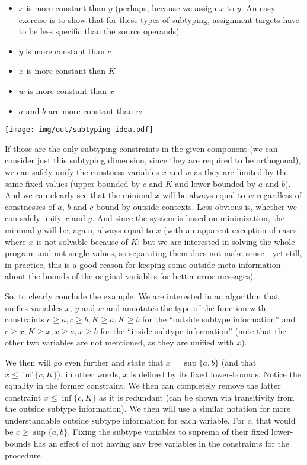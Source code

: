 \begin{itemize}
    \item $x$ is more constant than $y$ (perhaps, because we assign $x$ to $y$. An easy exercise is to show that for these types of subtyping, assignment targets have to be less specific than the source operands)
    \item $y$ is more constant than $c$
    \item $x$ is more constant than $K$
    \item $w$ is more constant than $x$
    \item $a$ and $b$ are more constant than $w$
\end{itemize}

\centerline{\texttt{[image: img/out/subtyping-idea.pdf]}}

If those are the only subtyping constraints in the given component (we can consider just this subtyping dimension, since they are required to be orthogonal), we can safely unify the constness variables $x$ and $w$ as they are limited by the same fixed values (upper-bounded by $c$ and $K$ and lower-bounded by $a$ and $b$). And we can clearly see that the minimal $x$ will be always equal to $w$ regardless of constnesses of $a$, $b$ and $c$ bound by outside contexts. Less obvious is, whether we can safely unify $x$ and $y$. And since the system is based on minimization, the minimal $y$ will be, again, always equal to $x$ (with an apparent exception of cases where $x$ is not solvable because of $K$; but we are interested in solving the whole program and not single values, so separating them does not make sense - yet still, in practice, this is a good reason for keeping some outside meta-information about the bounds of the original variables for better error messages).

So, to clearly conclude the example. We are interested in an algorithm that unifies variables $x$, $y$ and $w$ and annotates the type of the function with constraints $c \geq a, c \geq b, K \geq a, K \geq b$ for the ``outside subtype information'' and $c \geq x, K \geq x, x \geq a, x \geq b$ for the ``inside subtype information'' (note that the other two variables are not mentioned, as they are unified with $x$).

We then will go even further and state that $x = \sup \{a, b\}$ (and that $x \leq \inf \{c, K\}$), in other words, $x$ is defined by its fixed lower-bounds. Notice the equality in the former constraint. We then can completely remove the latter constraint $x \leq \inf \{c, K\}$ as it is redundant (can be shown via transitivity from the outside subtype information).  We then will use a similar notation for more understandable outside subtype information for each variable. For $c$, that would be $c \geq \sup \{a, b\}$. Fixing the subtype variables to suprema of their fixed lower-bounds has an effect of not having any free variables in the constraints for the procedure.

